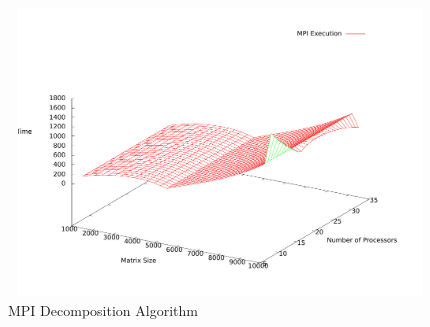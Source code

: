 \documentclass{article}
\begin{document}
\begin{figure}[H]
\begin{center}
\includegraphics[height=3in,width=5in]{MPI/Plot.pdf}
\caption{MPI Decomposition Algorithm}
\end{center}
\end{figure}
\end{document}
